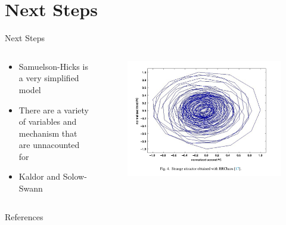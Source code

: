 \documentclass{beamer}
\begin{document}
\section*{Next Steps}
\begin{frame}{Next Steps}
	\begin{columns}
		\begin{column}{0.5\textwidth}
			\begin{itemize}
				\item
					Samuelson-Hicks is a very simplified model

				\item
					There are a variety of variables and mechanism that are unnacounted for

				\item
					Kaldor and Solow-Swann
			\end{itemize}
		\end{column}
		\begin{column}{0.5\textwidth}
			\begin{figure}
				\centering
				\includegraphics[width=\textwidth]{kaldor.png}
			\end{figure}
		\end{column}
	\end{columns}
\end{frame}

\begin{frame}[allowframebreaks]{References}
	\nocite{*}
	\printbibliography
\end{frame}
\end{document}
